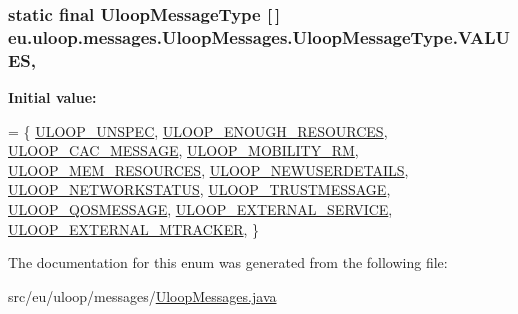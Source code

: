 \hypertarget{enumeu_1_1uloop_1_1messages_1_1UloopMessages_1_1UloopMessageType_acba7a3d491de5b16d9963b763ed919ee}{
\subsubsection[{V\+A\+L\+U\+E\+S}]{\setlength{\rightskip}{0pt plus 5cm} static  final {\bf Uloop\+Message\+Type} \mbox{[}$\,$\mbox{]} eu.\+uloop.\+messages.\+Uloop\+Messages.\+Uloop\+Message\+Type.\+V\+A\+L\+U\+E\+S\hspace{0.3cm}{\ttfamily [static]}, {\ttfamily [private]}}}\label{enumeu_1_1uloop_1_1messages_1_1UloopMessages_1_1UloopMessageType_acba7a3d491de5b16d9963b763ed919ee}
{\bfseries Initial value\+:}
\begin{DoxyCode}
= \{
      \hyperlink{enumeu_1_1uloop_1_1messages_1_1UloopMessages_1_1UloopMessageType_a457cbfce646e37005987a686aa1f876e}{ULOOP\_UNSPEC}, \hyperlink{enumeu_1_1uloop_1_1messages_1_1UloopMessages_1_1UloopMessageType_ad2d2caa5e4a4fd68d44f422b23af44ac}{ULOOP\_ENOUGH\_RESOURCES}, 
      \hyperlink{enumeu_1_1uloop_1_1messages_1_1UloopMessages_1_1UloopMessageType_a7290b987c0c214555491be7c4fc45835}{ULOOP\_CAC\_MESSAGE}, \hyperlink{enumeu_1_1uloop_1_1messages_1_1UloopMessages_1_1UloopMessageType_a4c6be9e1d2048fb126a0c309ed5e8acf}{ULOOP\_MOBILITY\_RM}, 
      \hyperlink{enumeu_1_1uloop_1_1messages_1_1UloopMessages_1_1UloopMessageType_acfcddc123ef961d02b619e0e687a625a}{ULOOP\_MEM\_RESOURCES}, \hyperlink{enumeu_1_1uloop_1_1messages_1_1UloopMessages_1_1UloopMessageType_afe52072954431f52c76dfc1abcc26807}{ULOOP\_NEWUSERDETAILS}, 
      \hyperlink{enumeu_1_1uloop_1_1messages_1_1UloopMessages_1_1UloopMessageType_a9e9d5e8074b3576749dcd41a7cc4545c}{ULOOP\_NETWORKSTATUS}, \hyperlink{enumeu_1_1uloop_1_1messages_1_1UloopMessages_1_1UloopMessageType_a00a2706ce85a9e84cbc0218c55804705}{ULOOP\_TRUSTMESSAGE}, 
      \hyperlink{enumeu_1_1uloop_1_1messages_1_1UloopMessages_1_1UloopMessageType_ac62db035f61911b6d5a8a1de969cb817}{ULOOP\_QOSMESSAGE}, \hyperlink{enumeu_1_1uloop_1_1messages_1_1UloopMessages_1_1UloopMessageType_a2e48a358b6ba1af599146c95c4449b09}{ULOOP\_EXTERNAL\_SERVICE}, 
      \hyperlink{enumeu_1_1uloop_1_1messages_1_1UloopMessages_1_1UloopMessageType_a5279fcb970ff6e20df2536163d3cd33a}{ULOOP\_EXTERNAL\_MTRACKER}, 
    \}
\end{DoxyCode}


The documentation for this enum was generated from the following file\+:\begin{DoxyCompactItemize}
\item 
src/eu/uloop/messages/\hyperlink{UloopMessages_8java}{Uloop\+Messages.\+java}\end{DoxyCompactItemize}
